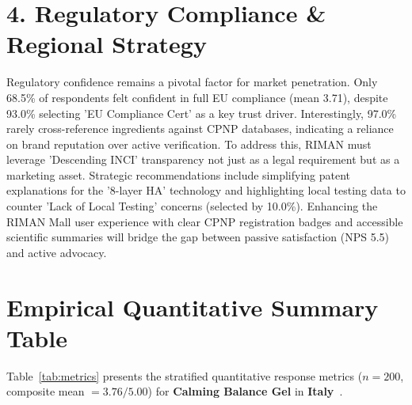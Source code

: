 \documentclass[10pt,twocolumn,a4paper]{article}
\begin{document}
\section{4. Regulatory Compliance \& Regional Strategy}
Regulatory confidence remains a pivotal factor for market penetration. Only 68.5\% of respondents felt confident in full EU compliance (mean 3.71), despite 93.0\% selecting 'EU Compliance Cert' as a key trust driver. Interestingly, 97.0\% rarely cross-reference ingredients against CPNP databases, indicating a reliance on brand reputation over active verification. To address this, RIMAN must leverage 'Descending INCI' transparency not just as a legal requirement but as a marketing asset. Strategic recommendations include simplifying patent explanations for the '8-layer HA' technology and highlighting local testing data to counter 'Lack of Local Testing' concerns (selected by 10.0\%). Enhancing the RIMAN Mall user experience with clear CPNP registration badges and accessible scientific summaries will bridge the gap between passive satisfaction (NPS 5.5) and active advocacy.


\section{Empirical Quantitative Summary Table}
Table~\ref{tab:metrics} presents the stratified quantitative response metrics ($n = 200$, composite mean $= 3.76/5.00$) for \textbf{Calming Balance Gel} in \textbf{Italy}~\cite{ref_kaggle_doi,ref_hf_doi}.
\end{document}
